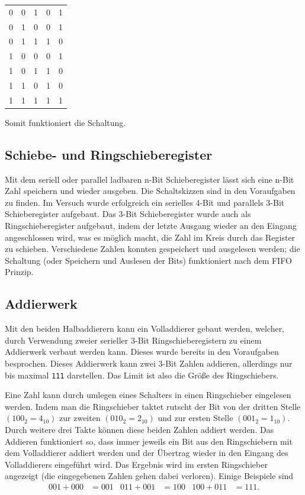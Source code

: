 \documentclass[10pt]{article}
\begin{document}
\begin{multicols}{2}
\begin{center}
\begin{tabular}{|c|c|c|c|c|}
			0        & 0   & 1   & 0   & 1   \\
			0        & 1   & 0   & 0   & 1   \\
			0        & 1   & 1   & 1   & 0   \\
			1        & 0   & 0   & 0   & 1   \\
			1        & 0   & 1   & 1   & 0   \\
			1        & 1   & 0   & 1   & 0   \\
			1        & 1   & 1   & 1   & 1   \\
			\hline
		\end{tabular}
	\end{center}
	Somit funktioniert die Schaltung.

	\subsection{Schiebe- und Ringschieberegister}
	Mit dem seriell oder parallel ladbaren n-Bit Schieberegister lässt sich eine n-Bit Zahl speichern und wieder ausgeben.
	Die Schaltskizzen sind in den Voraufgaben zu finden.
	Im Versuch wurde erfolgreich ein serielles 4-Bit und parallels 3-Bit Schieberegister aufgebaut.
	Das 3-Bit Schieberegister wurde auch als Ringschieberegister aufgebaut, indem der letzte Ausgang wieder an den Eingang angeschlossen wird, was es möglich macht, die Zahl \glqq im Kreis\grqq{} durch das Register zu schieben.
	Verschiedene Zahlen konnten gespeichert und ausgelesen werden; die Schaltung (oder Speichern und Auslesen der Bits) funktioniert nach dem FIFO Prinzip.

	\subsection{Addierwerk}
	Mit den beiden Halbaddierern kann ein Volladdierer gebaut werden, welcher, durch Verwendung zweier serieller 3-Bit Ringschieberegistern zu einem Addierwerk verbaut werden kann.
	Dieses wurde bereits in den Voraufgaben besprochen.
	Dieses Addierwerk kann zwei 3-Bit Zahlen addieren, allerdings nur bis maximal \texttt{111} darstellen.
	Das Limit ist also die Größe des Ringschiebers.
	\par Eine Zahl kann durch umlegen eines Schalters in einen Ringschieber eingelesen werden.
	Indem man die Ringschieber taktet \glqq rutscht\grqq{} der Bit von der dritten Stelle $\left(100_2=4_{10}\right)$ zur zweiten $\left(010_2=2_{10}\right)$ und zur ersten Stelle $\left(001_2=1_{10}\right)$.
	Durch weitere drei Takte können diese beiden Zahlen addiert werden.
	Das Addieren funktioniert so, dass immer jeweils ein Bit aus den Ringschiebern mit dem Volladdierer addiert werden und der Übertrag wieder in den Eingang des Volladdierers eingeführt wird.
	Das Ergebnis wird im ersten Ringschieber angezeigt (die eingegebenen Zahlen gehen dabei verloren).
	Einige Beispiele sind
	\begin{align*}
		001+000 & =001 & 011+001 & =100 & 100+011 & =111
		.
	\end{align*}


\end{multicols}
\end{document}
